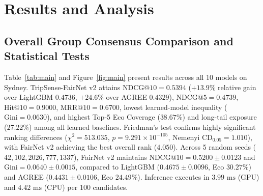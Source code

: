 \documentclass[preprint,12pt]{elsarticle}
\begin{document}
\section{Results and Analysis}

\subsection{Overall Group Consensus Comparison and Statistical Tests}
Table~\ref{tab:main} and Figure~\ref{fig:main} present results across all 10 models on Sydney. TripSense-FairNet v2 attains $\text{NDCG@10} = 0.5394$ ($+13.9\%$ relative gain over LightGBM $0.4736$, $+24.6\%$ over AGREE $0.4329$), $\text{NDCG@5} = 0.4739$, $\text{Hit@10} = 0.9000$, $\text{MRR@10} = 0.6700$, lowest learned-model inequality ($\text{Gini} = 0.0630$), and highest Top-5 Eco Coverage ($38.67\%$) and long-tail exposure ($27.22\%$) among all learned baselines. Friedman's test confirms highly significant ranking differences ($\chi^2 = 513.035$, $p = 9.291 \times 10^{-105}$, Nemenyi $\text{CD}_{0.05} = 1.010$), with FairNet v2 achieving the best overall rank ($4.050$). Across 5 random seeds ($42, 102, 2026, 777, 1337$), FairNet v2 maintains $\text{NDCG@10} = 0.5200 \pm 0.0123$ and $\text{Gini} = 0.0640 \pm 0.0015$, compared to LightGBM ($0.4675 \pm 0.0096$, Eco $30.27\%$) and AGREE ($0.4431 \pm 0.0106$, Eco $24.49\%$). Inference executes in $3.99\text{ ms}$ (GPU) and $4.42\text{ ms}$ (CPU) per 100 candidates.
\end{document}

